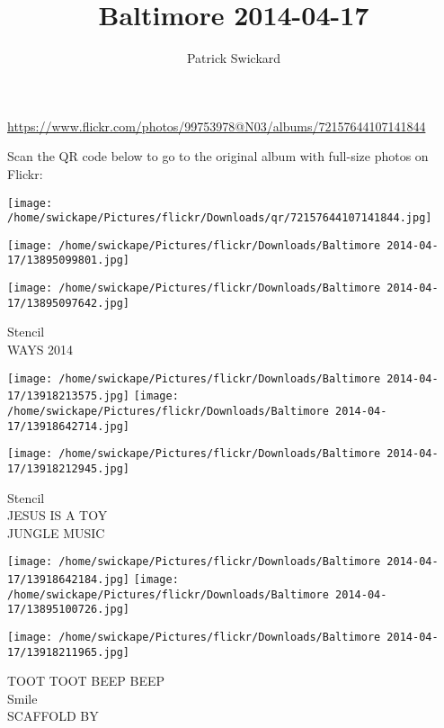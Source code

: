 \documentclass[10pt,letterpaper]{article}
\title{Baltimore 2014-04-17}
\author{Patrick Swickard}
\date{}
\begin{document}
\maketitle

\url{https://www.flickr.com/photos/99753978@N03/albums/72157644107141844}

Scan the QR code below to go to the original album with full-size photos on Flickr:

\texttt{[image: /home/swickape/Pictures/flickr/Downloads/qr/72157644107141844.jpg]}
\pagebreak

\texttt{[image: /home/swickape/Pictures/flickr/Downloads/Baltimore 2014-04-17/13895099801.jpg]}

\vspace{0.25in}
\texttt{[image: /home/swickape/Pictures/flickr/Downloads/Baltimore 2014-04-17/13895097642.jpg]}

Stencil\\
WAYS 2014
\pagebreak

\texttt{[image: /home/swickape/Pictures/flickr/Downloads/Baltimore 2014-04-17/13918213575.jpg]}
\texttt{[image: /home/swickape/Pictures/flickr/Downloads/Baltimore 2014-04-17/13918642714.jpg]}

\vspace{0.25in}
\texttt{[image: /home/swickape/Pictures/flickr/Downloads/Baltimore 2014-04-17/13918212945.jpg]}

Stencil\\
JESUS IS A TOY\\
JUNGLE MUSIC
\pagebreak

\texttt{[image: /home/swickape/Pictures/flickr/Downloads/Baltimore 2014-04-17/13918642184.jpg]}
\texttt{[image: /home/swickape/Pictures/flickr/Downloads/Baltimore 2014-04-17/13895100726.jpg]}

\texttt{[image: /home/swickape/Pictures/flickr/Downloads/Baltimore 2014-04-17/13918211965.jpg]}

TOOT TOOT BEEP BEEP\\
Smile\\
SCAFFOLD BY
\pagebreak
\end{document}
